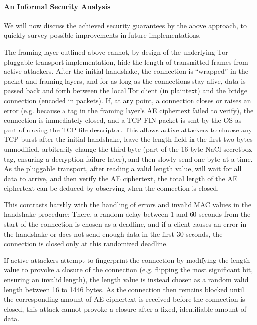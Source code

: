 \paragraph{An Informal Security Analysis}

We will now discuss the achieved security guarantees by the above approach, to quickly survey possible improvements in future implementations.

The framing layer outlined above cannot, by design of the underlying Tor pluggable transport implementation, hide the length of transmitted frames from active attackers.
After the initial handshake, the connection is ``wrapped'' in the packet and framing layers, and for as long as the connections stay alive, data is passed back and forth between the local Tor client (in plaintext) and the bridge connection (encoded in packets).
If, at any point, a connection closes or raises an error (e.g. because a tag in the framing layer's AE ciphertext failed to verify), the connection is immediately closed, and a TCP FIN packet is sent by the OS as part of closing the TCP file descriptor.
This allows active attackers to choose any TCP burst after the initial handshake, leave the length field in the first two bytes unmodified, arbitrarily change the third byte (part of the 16 byte NaCl secretbox tag, ensuring a decryption failure later), and then slowly send one byte at a time. As the pluggable transport, after reading a valid length value, will wait for all data to arrive, and then verify the AE ciphertext, the total length of the AE ciphertext can be deduced by observing when the connection is closed.

This contrasts harshly with the handling of errors and invalid MAC values in the handshake procedure: There, a random delay between 1 and 60 seconds from the start of the connection is chosen as a deadline, and if a client causes an error in the handshake or does not send enough data in the first 30 seconds, the connection is closed only at this randomized deadline.

If active attackers attempt to fingerprint the connection by modifying the length value to provoke a closure of the connection (e.g. flipping the most significant bit, ensuring an invalid length), the length value is instead chosen as a random valid length between 16 to 1446 bytes. As the connection then remains blocked until the corresponding amount of AE ciphertext is received before the connection is closed, this attack cannot provoke a closure after a fixed, identifiable amount of data.

